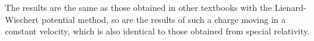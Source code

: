 \documentclass[11pt]{article}              %
\begin{document}
The results are the same as those obtained in other textbooks with the Lienard-Wiechert potential method, so are the results of such a charge moving in a constant velocity, which is also identical to those obtained from special relativity.













\end{document}
